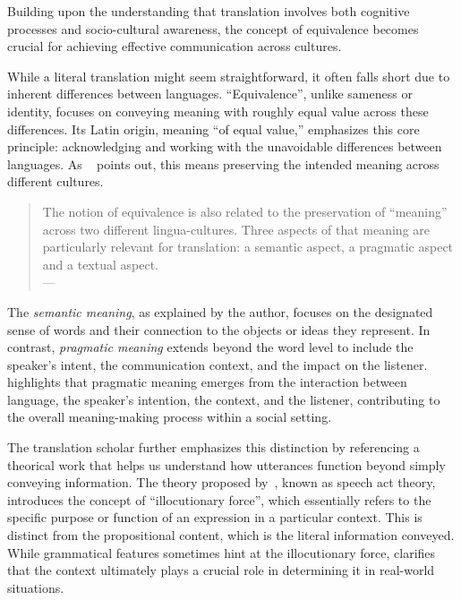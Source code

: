 Building upon the understanding that translation involves both cognitive processes and socio-cultural awareness, the concept of equivalence becomes crucial for achieving effective communication across cultures. 

While a literal translation might seem straightforward, it often falls short due to inherent differences between languages. \enquote{Equivalence}, unlike sameness or identity, focuses on conveying meaning with roughly equal value across these differences. Its Latin origin, meaning \enquote{of equal value,} emphasizes this core principle: acknowledging and working with the unavoidable differences between languages. As ~\textcite[6]{house2014translation} points out, this means preserving the intended meaning across different cultures.

\begin{quote}
The notion of equivalence is also related to the preservation of \enquote{meaning} across two different lingua-cultures. Three aspects of that meaning are particularly relevant for translation: a semantic aspect, a pragmatic aspect and a textual aspect. \\
\phantom{abc} \hfill --- \textcite[21]{house2014translation}
\end{quote}


The \textit{semantic meaning}, as explained by the author, focuses on the designated sense of words and their connection to the objects or ideas they represent. In contrast, \textit{pragmatic meaning} extends beyond the word level to include the speaker's intent, the communication context, and the impact on the listener. \textcite{house2014translation} highlights that pragmatic meaning emerges from the interaction between language, the speaker’s intention, the context, and the listener, contributing to the overall meaning-making process within a social setting.

The translation scholar further emphasizes this distinction by referencing a theorical work that helps us understand how utterances function beyond simply conveying information. The theory proposed by~\textcite{austin1962how, Searle1995-SEATCO}, known as speech act theory, introduces the concept of ``illocutionary force'', which essentially refers to the specific purpose or function of an expression in a particular context. This is distinct from the propositional content, which is the literal information conveyed. While grammatical features sometimes hint at the illocutionary force, \textcite[22]{house2014translation} clarifies that the context ultimately plays a crucial role in determining it in real-world situations.

